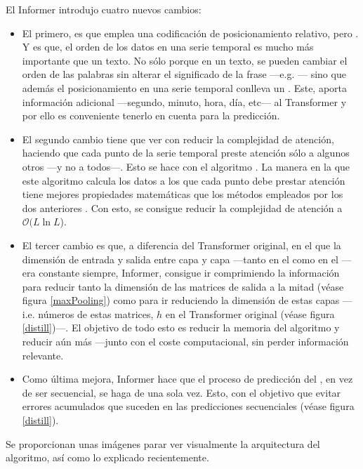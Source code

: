 El Informer introdujo cuatro nuevos cambios:
\begin{itemize}
    \item El primero, es que emplea una codificación de posicionamiento relativo, pero . Y es que, el orden de los datos en una serie temporal es mucho más importante que un texto. No sólo porque en un texto, se pueden cambiar el orden de las palabras sin alterar el significado de la frase ---e.g. --- sino que además el posicionamiento en una serie temporal conlleva un . Este, aporta información adicional ---segundo, minuto, hora, día, etc--- al Transformer y por ello es conveniente tenerlo en cuenta para la predicción\fnm.
    \item El segundo cambio tiene que ver con reducir la complejidad de atención, haciendo que cada punto de la serie temporal preste atención sólo a algunos otros ---y no a todos---. Esto se hace con el algoritmo \fnm. La manera en la que este algoritmo calcula los datos a los que cada punto debe prestar atención tiene mejores propiedades matemáticas que los métodos empleados por los dos anteriores \parencite{SparseTransformer} \parencite{logSparse}. Con esto, se consigue reducir la complejidad de atención a $\mathcal{O}(L \ln L$).
    \item El tercer cambio es que, a diferencia del Transformer original, en el que la dimensión de entrada y  salida entre capa y capa ---tanto en el  como en el --- era constante siempre, Informer, consigue ir comprimiendo la información para reducir tanto la dimensión de las matrices de salida a la mitad\fnm \hspace{1.5pt} (véase figura \ref{maxPooling}) como para ir reduciendo la dimensión de estas capas ---i.e.  números de estas matrices, $h$ en el Transformer original (véase figura \ref{distill})---. El objetivo de todo esto es reducir la memoria del algoritmo y reducir aún más ---junto con  el coste computacional, sin perder información relevante.
    \item Como última mejora, Informer hace que el proceso  de predicción del , en vez de ser secuencial, se haga de una sola vez. Esto, con el objetivo que evitar errores acumulados que suceden en las predicciones  secuenciales (véase figura \ref{distill}).
\end{itemize}
\addtocounter{footnote}{1}
\addtocounter{footnote}{1}
Se proporcionan unas imágenes parar ver visualmente la arquitectura del algoritmo, así como lo explicado recientemente.

